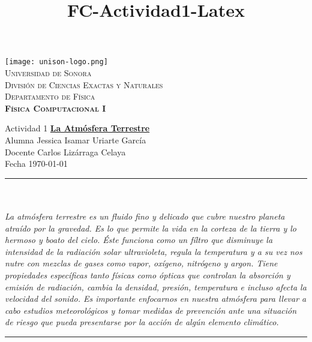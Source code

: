 \documentclass[12pt]{article}
\title{FC-Actividad1-Latex}
\begin{document}

\begin{center}


\texttt{[image: unison-logo.png]}~\\[0.8cm]

\textsc{\LARGE Universidad de Sonora}\\[0.1cm]
\textsc{Divisi\'on de Ciencias Exactas y Naturales}\\[0.1cm]
\textsc{Departamento de F\'isica \\[0.5cm] \textbf{F\'isica Computacional I}}\\%


\end{center}
\noindent
Actividad 1 \dotfill \textbf{\underline{La Atm\'osfera Terrestre}}\\
Alumna \dotfill Jessica Isamar Uriarte Garc\'ia \\
Docente \dotfill Carlos Liz\'arraga Celaya \\
Fecha \dotfill \today \\
\rule{\linewidth}{0.5pt} \\[6pt] 
\abstractname{\\ \emph{ \scriptsize{  \baselinestretch La atm\'osfera terrestre es un fluido fino y delicado que cubre nuestro planeta atra\'ido por la gravedad. Es lo que permite la vida en la corteza de la tierra y lo hermoso y boato del cielo. \'Este funciona como un f\'iltro que disminuye la intensidad de la radiaci\'on solar ultravioleta, regula la temperatura y a su vez nos nutre con mezclas de gases como vapor, ox\'igeno, nitr\'ogeno y argon. Tiene propiedades espec\'ificas tanto f\'isicas como \'opticas que controlan la absorci\'on y emisi\'on de radiaci\'on, cambia la densidad, presi\'on, temperatura e incluso afecta la velocidad del sonido. Es importante enfocarnos en nuestra atm\'osfera para llevar a cabo estudios meteorol\'ogicos y tomar medidas de prevenci\'on ante una situaci\'on de riesgo que pueda presentarse por la acci\'on de alg\'un elemento clim\'atico.  \\} }}
\renewcommand{\baselinestretch}{0.6}
\rule{\linewidth}{2pt}  
\small\tableofcontents
\end{document}
